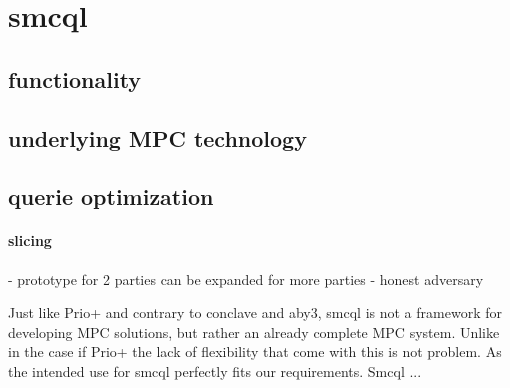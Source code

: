 \section{smcql}

\subsection{functionality}



\subsection{underlying MPC technology}


\subsection{querie optimization   }
\paragraph{slicing}




- prototype for 2 parties can be expanded for more parties
- honest adversary


Just like Prio+ and contrary to conclave and aby3, smcql is not a framework for developing MPC solutions, but rather an already complete MPC system. Unlike in the case if Prio+ the lack of flexibility that come with this is not problem. As the intended use for smcql perfectly fits our requirements. Smcql ...
